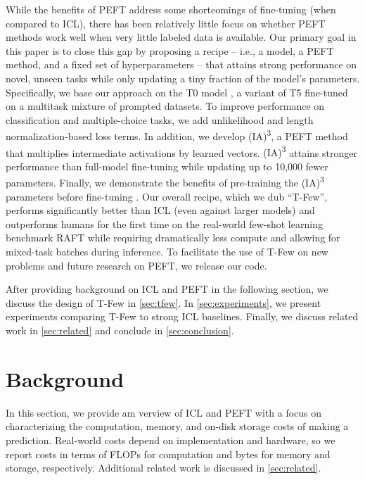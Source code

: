 \documentclass{article}
\newcommand{\ia}{{\fontfamily{lmtt}\selectfont (IA)\textsuperscript{3}}\xspace}
\newcommand{\tfew}{{\fontfamily{lmtt}\selectfont T-Few}\xspace}
\begin{document}
While the benefits of PEFT address some shortcomings of fine-tuning (when compared to ICL), there has been relatively little focus on whether PEFT methods work well when very little labeled data is available.
Our primary goal in this paper is to close this gap by proposing a recipe -- i.e., a model, a PEFT method, and a fixed set of hyperparameters -- that attains strong performance on novel, unseen tasks while only updating a tiny fraction of the model's parameters.
Specifically, we base our approach on the T0 model \cite{sanh2021multitask}, a variant of T5 \cite{raffel2019exploring} fine-tuned on a multitask mixture of prompted datasets.
To improve performance on classification and multiple-choice tasks, we add unlikelihood \cite{tam2021improving,welleck2019neural} and length normalization-based \citep{brown2020language} loss terms.
In addition, we develop \ia, a PEFT method that multiplies intermediate activations by learned vectors.
\ia attains stronger performance than full-model fine-tuning while updating up to 10,000 fewer parameters.
Finally, we demonstrate the benefits of pre-training the \ia parameters before fine-tuning \citep{gu2021ppt, vu2021spot}.
Our overall recipe, which we dub ``\tfew'', performs significantly better than ICL (even against  larger models) and outperforms humans for the first time on the real-world few-shot learning benchmark RAFT \citep{alex2021raft} while requiring dramatically less compute and allowing for mixed-task batches during inference.
To facilitate the use of \tfew on new problems and future research on PEFT, we release our code.

After providing background on ICL and PEFT in the following section, we discuss the design of \tfew in \cref{sec:tfew}.
In \cref{sec:experiments}, we present experiments comparing \tfew to strong ICL baselines.
Finally, we discuss related work in \cref{sec:related} and conclude in \cref{sec:conclusion}.

\section{Background}
In this section, we provide am verview of ICL and PEFT with a focus on characterizing the computation, memory, and on-disk storage costs of making a prediction.
Real-world costs depend on implementation and hardware, so we report costs in terms of FLOPs for computation and bytes for memory and storage, respectively.
Additional related work is discussed in \cref{sec:related}.
\end{document}
